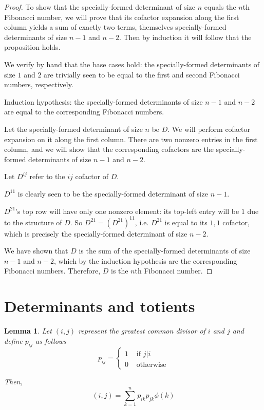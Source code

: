 \documentclass{article}
\newtheorem{lemma}{Lemma}
\begin{document}
\begin{proof}
    To show that the specially-formed determinant of size $n$ equals the $n$th
    Fibonacci number, we will prove that its cofactor expansion along the first
    column yields a sum of exactly two terms, themselves specially-formed
    determinants of size $n-1$ and $n-2$. Then by induction it will follow that
    the proposition holds.

    We verify by hand that the base cases hold: the specially-formed
    determinants of size $1$ and $2$ are trivially seen to be equal to the
    first and second Fibonacci numbers, respectively.

    Induction hypothesis: the specially-formed determinants of size $n-1$ and $n-2$
    are equal to the corresponding Fibonacci numbers.

    Let the specially-formed determinant of size $n$ be $D$. We will perform
    cofactor expansion on it along the first column. There are two nonzero
    entries in the first column, and we will show that the corresponding
    cofactors are the specially-formed determinants of size $n-1$ and $n-2$.

    Let $D^{ij}$ refer to the $ij$ cofactor of $D$.

    $D^{11}$ is clearly seen to be the specially-formed determinant of size
    $n-1$.

    $D^{21}$'s top row will have only one nonzero element: its top-left entry
    will be $1$ due to the structure of $D$. So $D^{21} = (D^{21})^{11}$, i.e.
    $D^{21}$ is equal to its $1,1$ cofactor, which is precisely the
    specially-formed determinant of size $n-2$.

    We have shown that $D$ is the sum of the specially-formed determinants of
    size $n-1$ and $n-2$, which by the induction hypothesis are the
    corresponding Fibonacci numbers.
    Therefore, $D$ is the $n$th Fibonacci number.
\end{proof}

\section{Determinants and totients}

\begin{lemma}
    Let $(i,j)$ represent the greatest common divisor of $i$ and $j$ and
    define $p_{ij}$ as follows
    $$
    p_{ij} =
    \begin{cases}
        1 & \text{ if } j|i \\
        0 & \text{ otherwise}
    \end{cases}
    $$

    Then,
    $$(i, j) = \sum_{k=1}^n {p_{ik} p_{jk} \phi(k)}$$
\end{lemma}
\end{document}
